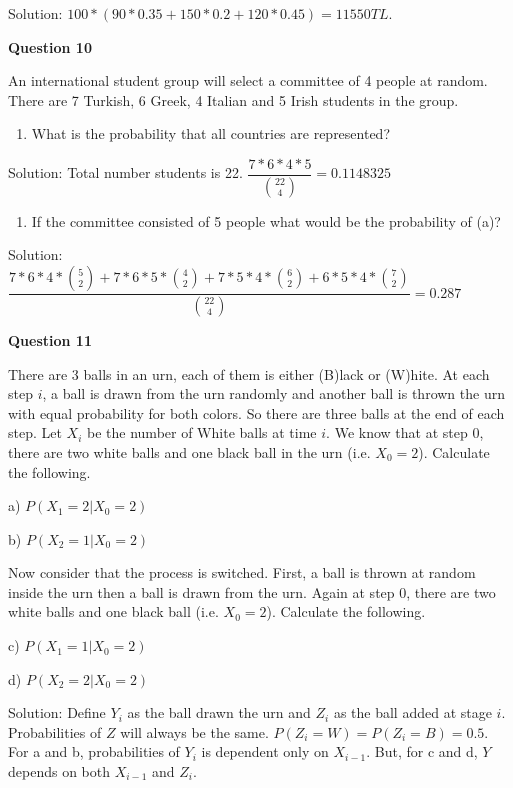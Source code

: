 \documentclass[]{book}
\providecommand{\tightlist}{%
  \setlength{\itemsep}{0pt}\setlength{\parskip}{0pt}}
\theoremstyle{definition}
\theoremstyle{definition}
\theoremstyle{definition}
\theoremstyle{remark}
\begin{document}
Solution: \(100*(90*0.35 + 150*0.2 + 120*0.45) = 11550TL\).

\textbf{Question 10}

An international student group will select a committee of 4 people at
random. There are 7 Turkish, 6 Greek, 4 Italian and 5 Irish students in
the group.

\begin{enumerate}
\def\labelenumi{\alph{enumi})}
\tightlist
\item
  What is the probability that all countries are represented?
\end{enumerate}

Solution: Total number students is 22.
\(\dfrac{7*6*4*5}{\binom{22}{4}} = 0.1148325\)

\begin{enumerate}
\def\labelenumi{\alph{enumi})}
\setcounter{enumi}{1}
\tightlist
\item
  If the committee consisted of 5 people what would be the probability
  of (a)?
\end{enumerate}

Solution:
\(\dfrac{7*6*4*\binom{5}{2} + 7*6*5*\binom{4}{2} + 7*5*4*\binom{6}{2} + 6*5*4*\binom{7}{2}}{\binom{22}{4}} = 0.287\)

\textbf{Question 11}

There are 3 balls in an urn, each of them is either (B)lack or (W)hite.
At each step \(i\), a ball is drawn from the urn randomly and another
ball is thrown the urn with equal probability for both colors. So there
are three balls at the end of each step. Let \(X_i\) be the number of
White balls at time \(i\). We know that at step 0, there are two white
balls and one black ball in the urn (i.e. \(X_0 = 2\)). Calculate the
following.

a) \(P(X_1 = 2 | X_0 = 2)\)

b) \(P(X_2 = 1 | X_0 = 2)\)

Now consider that the process is switched. First, a ball is thrown at
random inside the urn then a ball is drawn from the urn. Again at step
0, there are two white balls and one black ball (i.e. \(X_0 = 2\)).
Calculate the following.

c) \(P(X_1 = 1 | X_0 = 2)\)

d) \(P(X_2 = 2 | X_0 = 2)\)

Solution: Define \(Y_i\) as the ball drawn the urn and \(Z_i\) as the
ball added at stage \(i\). Probabilities of \(Z\) will always be the
same. \(P(Z_i=W) = P(Z_i=B) = 0.5\). For a and b, probabilities of
\(Y_i\) is dependent only on \(X_{i-1}\). But, for c and d, \(Y\)
depends on both \(X_{i-1}\) and \(Z_i\).
\end{document}

